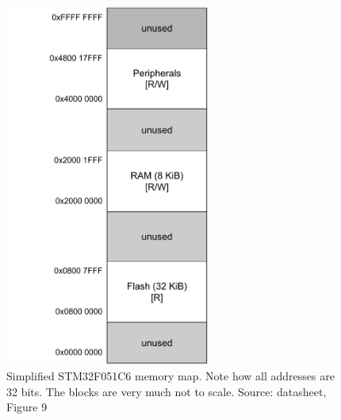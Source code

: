 \begin{figure}
  \centering
  \includegraphics[width=0.6\textwidth]{./fig/memory_model_v0.pdf}
  \caption{Simplified STM32F051C6 memory map. Note how all addresses are 32 bits. The blocks are very much not to scale. Source: datasheet, Figure 9}
  \label{fig:memory_map}
\end{figure}

